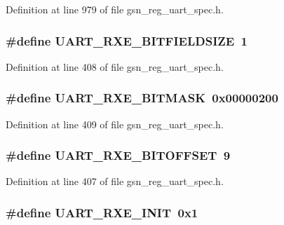 Definition at line 979 of file gsn\_\-reg\_\-uart\_\-spec.h.

\hypertarget{a00575_a82c436eb21c6a895bd077eedaf03a01b}{
\subsubsection[{UART\_\-RXE\_\-BITFIELDSIZE}]{\setlength{\rightskip}{0pt plus 5cm}\#define UART\_\-RXE\_\-BITFIELDSIZE~1}}
\label{a00575_a82c436eb21c6a895bd077eedaf03a01b}


Definition at line 408 of file gsn\_\-reg\_\-uart\_\-spec.h.

\hypertarget{a00575_a142d76bbf22ca275959f2c1549b0b6e9}{
\subsubsection[{UART\_\-RXE\_\-BITMASK}]{\setlength{\rightskip}{0pt plus 5cm}\#define UART\_\-RXE\_\-BITMASK~0x00000200}}
\label{a00575_a142d76bbf22ca275959f2c1549b0b6e9}


Definition at line 409 of file gsn\_\-reg\_\-uart\_\-spec.h.

\hypertarget{a00575_a7849466ceb06a7f2071d4041f089a261}{
\subsubsection[{UART\_\-RXE\_\-BITOFFSET}]{\setlength{\rightskip}{0pt plus 5cm}\#define UART\_\-RXE\_\-BITOFFSET~9}}
\label{a00575_a7849466ceb06a7f2071d4041f089a261}


Definition at line 407 of file gsn\_\-reg\_\-uart\_\-spec.h.

\hypertarget{a00575_ad9a6c1a54a2696a7ec51c2b4c0330de7}{
\subsubsection[{UART\_\-RXE\_\-INIT}]{\setlength{\rightskip}{0pt plus 5cm}\#define UART\_\-RXE\_\-INIT~0x1}}
\label{a00575_ad9a6c1a54a2696a7ec51c2b4c0330de7}


